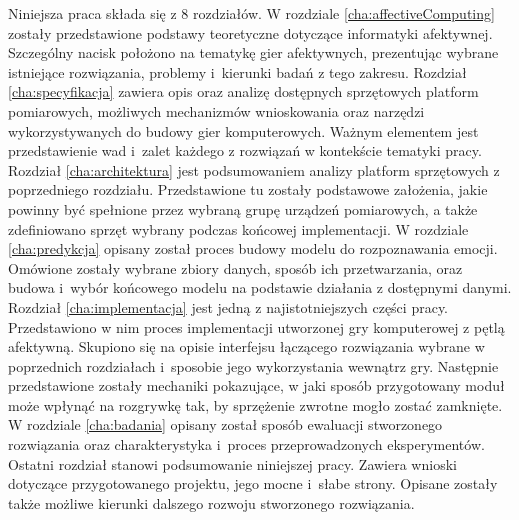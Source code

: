 Niniejsza praca składa się z 8 rozdziałów. W rozdziale \ref{cha:affectiveComputing} zostały przedstawione podstawy teoretyczne dotyczące informatyki afektywnej. Szczególny nacisk położono na tematykę gier afektywnych, prezentując wybrane istniejące rozwiązania, problemy i~kierunki badań z tego zakresu. Rozdział \ref{cha:specyfikacja} zawiera opis oraz analizę dostępnych sprzętowych platform pomiarowych, możliwych mechanizmów wnioskowania oraz narzędzi wykorzystywanych do budowy gier komputerowych. Ważnym elementem jest przedstawienie wad i~zalet każdego z rozwiązań w kontekście tematyki pracy. Rozdział \ref{cha:architektura} jest podsumowaniem analizy platform sprzętowych z poprzedniego rozdziału. Przedstawione tu zostały podstawowe założenia, jakie powinny być spełnione przez wybraną grupę urządzeń pomiarowych, a także zdefiniowano sprzęt wybrany podczas końcowej implementacji. W rozdziale \ref{cha:predykcja} opisany został proces budowy modelu do rozpoznawania emocji. Omówione zostały wybrane zbiory danych, sposób ich przetwarzania, oraz budowa i~wybór końcowego modelu na podstawie działania z dostępnymi danymi. Rozdział \ref{cha:implementacja} jest jedną z najistotniejszych części pracy. Przedstawiono w nim proces implementacji utworzonej gry komputerowej z pętlą afektywną. Skupiono się na opisie interfejsu łączącego rozwiązania wybrane w poprzednich rozdziałach i~sposobie jego wykorzystania wewnątrz gry. Następnie przedstawione zostały mechaniki pokazujące, w jaki sposób przygotowany moduł może wpłynąć na rozgrywkę tak, by sprzężenie zwrotne mogło zostać zamknięte. W rozdziale \ref{cha:badania} opisany został sposób ewaluacji stworzonego rozwiązania oraz charakterystyka i~proces przeprowadzonych eksperymentów. Ostatni rozdział stanowi podsumowanie niniejszej pracy. Zawiera wnioski dotyczące przygotowanego projektu, jego mocne i~słabe strony. Opisane zostały także możliwe kierunki dalszego rozwoju stworzonego rozwiązania. 
